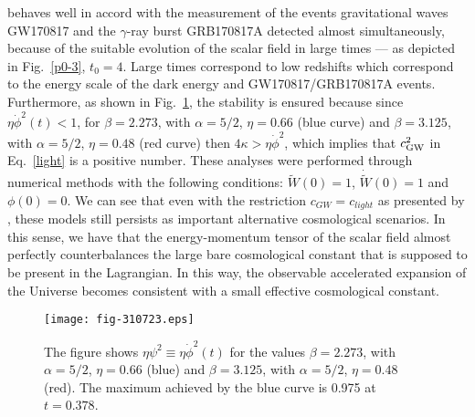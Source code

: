 \documentclass[aps,12pt, a4paper,nofootinbib]{revtex4}
\begin{document}
{behaves well in accord with the measurement of the events gravitational waves GW170817 and the $\gamma$-ray burst GRB170817A detected almost simultaneously, because of the suitable evolution of the scalar field in large times --- as depicted in Fig.~\ref{p0-3}, $t_0=4$. Large times correspond to low redshifts which correspond to the energy scale of the dark energy and GW170817/GRB170817A events. {Furthermore, as shown in Fig.~\ref{p1}, the stability is ensured because since $\eta\dot{\phi}^{2}(t)<1$, for $\beta=2.273$, with $\alpha=5/2$, $\eta=0.66$ (blue curve) and $\beta=3.125$, with $\alpha=5/2$, $\eta=0.48$ (red curve) then $4\kappa>\eta\dot{\phi}^2$, which implies that $c_{\rm GW}^2$ in Eq.~\eqref{light} is a positive number.  These analyses were performed through numerical methods with the following conditions: $\tilde{W}(0)=1$, $\dot{\tilde{W}}(0)=1$ and $\phi(0)=0$.  We can see that even with the restriction $c_{GW}=c_{light}$ as presented by \cite{Charmousis:2011bf,Charmousis:2011ea,Babichev:2017lmw,Starobinsky:2016kua,Bruneton:2012zk}, these models still persists as important alternative cosmological scenarios. In this sense, we have that the energy-momentum tensor of the scalar field almost perfectly counterbalances the large bare cosmological constant that is supposed to be present in the Lagrangian. In this way, the observable accelerated expansion of the Universe becomes consistent with a small effective cosmological constant.}

\begin{figure}[!ht]
\begin{center}
\texttt{[image: fig-310723.eps]}
\caption{The figure shows $\eta\psi^2\equiv\eta\dot{\phi}^{2}(t)$ for the values $\beta=2.273$, with $\alpha=5/2$, $\eta=0.66$ (blue) and $\beta=3.125$, with $\alpha=5/2$, $\eta=0.48$ (red). The maximum achieved by the blue curve is 0.975 at $t=0.378$.}
\label{p1}
\end{center}
\end{figure}

}
\end{document}
